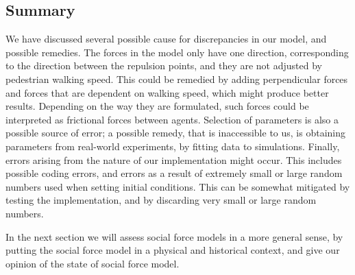 \subsection{Summary}
We have discussed several possible cause for discrepancies in our model, and 
possible remedies. The forces in the model only have one direction, 
corresponding to the direction between the repulsion points, and they are not 
adjusted by pedestrian walking speed. This could be remedied by adding 
perpendicular forces and forces that are dependent on walking speed, which 
might produce better results. Depending on the way they are formulated, such 
forces could be interpreted as frictional forces between agents. Selection of 
parameters is also a possible source of error; a possible remedy, that is 
inaccessible to us, is obtaining parameters from real-world experiments, by 
fitting data to simulations. Finally, errors arising from the nature of our 
implementation might occur. This includes possible coding errors, and errors 
as a result of extremely small or large random numbers used when setting 
initial conditions.  This can be somewhat mitigated by testing the 
implementation, and by discarding very small or large random numbers.

In the next section we will assess social force models in a more general sense, 
by putting the social force model in a physical and historical context, and give 
our opinion of the state of social force model.
